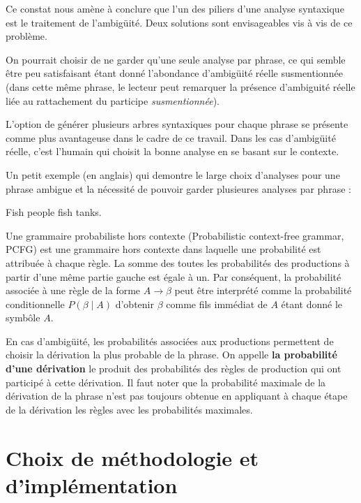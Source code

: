 \documentclass[12pt]{article}
\begin{document}
Ce constat nous am\`ene \`a conclure que l'un des piliers d'une
analyse syntaxique est le traitement de l'ambig\"uit\'e. Deux solutions sont
envisageables vis \`a vis de ce probl\`eme.\par

On pourrait choisir de ne garder qu'une seule analyse par phrase, ce qui semble \^etre peu satisfaisant \'etant
donn\'e l'abondance d'ambig\"uit\'e r\'eelle susmentionn\'ee (dans cette m\^eme phrase, le
lecteur peut remarquer la pr\'esence d'ambiguit\'e r\'eelle li\'ee au rattachement du
participe \emph{susmentionn\'ee}). \par

L'option de g\'en\'erer plusieurs arbres syntaxiques pour chaque phrase se pr\'esente comme
plus avantageuse dans le cadre de ce travail. Dans les cas d'ambig\"uit\'e
r\'eelle, c'est l'humain qui choisit la bonne analyse en se basant sur le
contexte. \par

Un petit exemple (en anglais) qui demontre le large
choix d'analyses pour une phrase ambigue et la n\'ecessit\'e de pouvoir garder plusieures analyses par phrase :

\begin{exe}
\ex Fish people fish tanks.
\end{exe}

Une grammaire probabiliste hors contexte (Probabilistic context-free grammar,
PCFG) est une grammaire hors contexte dans laquelle une probabilit\'e est
attribu\'ee \`a chaque r\`egle. La somme des toutes les probabilit\'es des
productions \`a partir d'une m\^eme partie gauche est \'egale \`a un. Par cons\'equent,
la probabilit\'e associ\'ee \`a une r\`egle de la forme $A \rightarrow \beta$ peut \^etre interpr\'et\'e
comme la probabilit\'e conditionnelle $P(\beta \mid A)$ d'obtenir $\beta$ comme fils imm\'ediat de $A$ \'etant
donn\'e le symb\^ole $A$. \par

En cas d'ambig\"uit\'e, les probabilit\'es associ\'ees aux productions permettent
de choisir la d\'erivation la plus probable de la phrase. On appelle \textbf{la
probabilit\'e d'une d\'erivation} le produit des probabilit\'es des r\`egles de
production qui ont particip\'e \`a cette d\'erivation. Il faut noter que la
probabilit\'e maximale de la d\'erivation de la phrase n'est pas toujours obtenue
en appliquant \`a chaque \'etape de la d\'erivation les r\`egles avec les probabilit\'es
maximales.

\section{Choix de m\'ethodologie et d'impl\'ementation}
\end{document}
